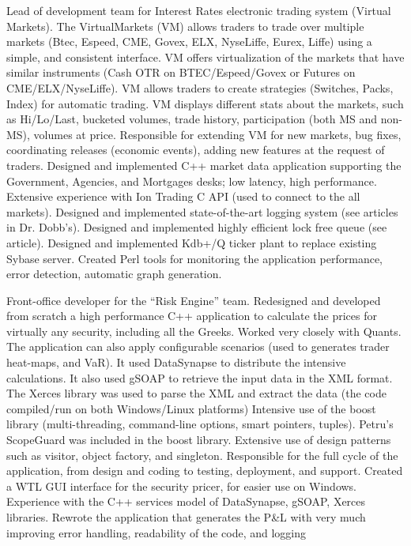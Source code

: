 \documentclass[8pt,a4paper,sans]{moderncv}
\begin{document}
         {Lead of development team for Interest Rates electronic trading system (Virtual Markets).
           The VirtualMarkets (VM) allows traders to trade over multiple markets (Btec, Espeed, CME,
           Govex, ELX, NyseLiffe, Eurex, Liffe) using a simple, and consistent interface. 
           VM offers virtualization of the markets that have similar instruments (Cash OTR on BTEC/Espeed/Govex or
           Futures on CME/ELX/NyseLiffe).
           VM allows traders to create strategies (Switches, Packs, Index) for automatic trading.
           VM displays different stats about the markets, such as Hi/Lo/Last, bucketed volumes, trade history,
           participation (both MS and non-MS), volumes at price.
           Responsible for extending VM for new markets, bug fixes, coordinating releases (economic events),
           adding new features at the request of traders.
           Designed and implemented C++ market data application supporting the Government, Agencies, and Mortgages
           desks; low latency, high performance.
           Extensive experience with Ion Trading C API (used to connect to the all markets).
           Designed and implemented state-of-the-art logging system (see articles in Dr. Dobb's).
           Designed and implemented highly efficient lock free queue (see article).
           Designed and implemented Kdb+/Q ticker plant to replace existing Sybase server.
           Created Perl tools for monitoring the application performance, error detection, automatic graph generation.}

        {Front-office developer for the ``Risk Engine'' team.
          Redesigned and developed from scratch a high performance C++ application to calculate the prices for virtually
          any security, including all the Greeks.
          Worked very closely with Quants.
          The application can also apply configurable scenarios (used to generates trader heat-maps, and VaR).
          It used DataSynapse to distribute the intensive calculations. It also used gSOAP to retrieve the
          input data in the XML format.
          The Xerces library was used to parse the XML and extract the data (the code compiled/run on both Windows/Linux platforms)
          Intensive use of the boost library (multi-threading, command-line options, smart pointers, tuples).
          Petru's ScopeGuard was included in the boost library.
          Extensive use of design patterns such as visitor, object factory, and singleton.
          Responsible for the full cycle of the application, from design and coding to testing, deployment, and support.
          Created a WTL GUI interface for the security pricer, for easier use on Windows.
          Experience with the C++ services model of DataSynapse, gSOAP, Xerces libraries.
          Rewrote the application that generates the P\&L with very much improving error handling,
          readability of the code, and logging}
\end{document}

